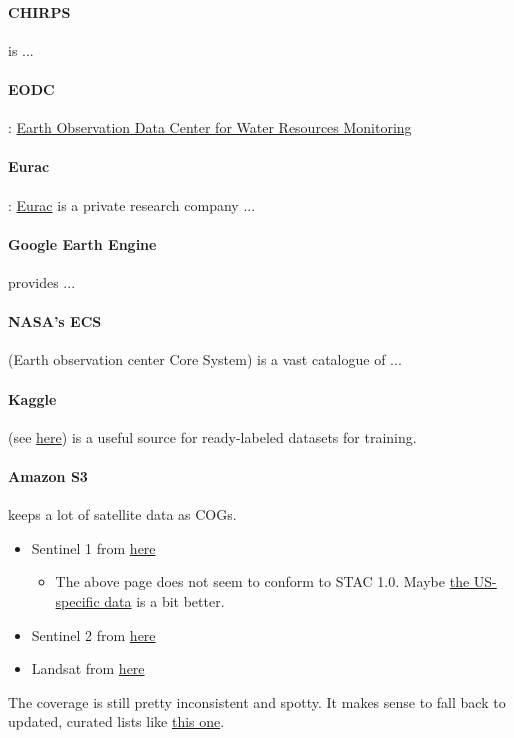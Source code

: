 \paragraph{CHIRPS} is ...

\paragraph{EODC}: \href{https://www.eodc.eu/}{Earth Observation Data Center for Water Resources Monitoring}

\paragraph{Eurac}: \href{http://www.eurac.edu}{Eurac} is a private research company ...

\paragraph{Google Earth Engine} provides ...

\paragraph{NASA's ECS} (Earth observation center Core System) is a vast catalogue of ...

\paragraph{Kaggle} (see \href{https://www.kaggle.com/search?q=sentinel}{here}) is a useful source for ready-labeled datasets for training.

\paragraph{Amazon S3} keeps a lot of satellite data as COGs. \begin{itemize}
    \item Sentinel 1 from \href{https://registry.opendata.aws/sentinel-1/}{here} \begin{itemize}
            \item The above page does not seem to conform to STAC 1.0. Maybe \href{https://raw.githubusercontent.com/scottyhq/sentinel1-rtc-stac/main/13SBD/catalog.json}{the US-specific data} is a bit better.
        \end{itemize}
    \item Sentinel 2 from \href{https://sentinel-cogs.s3.us-west-2.amazonaws.com/sentinel-s2-l2a-cogs/2020/S2A_36QWD_20200701_0_L2A/TCI.tif}{here}
    \item Landsat from \href{https://landsat-pds.s3.amazonaws.com/c1/L8/139/045/LC08_L1TP_139045_20170304_20170316_01_T1/LC08_L1TP_139045_20170304_20170316_01_T1}{here}
\end{itemize}
The coverage is still pretty inconsistent and spotty. It makes sense to fall back to updated, curated lists like \href{https://github.com/Fernerkundung/awesome-sentinel}{this one}.


